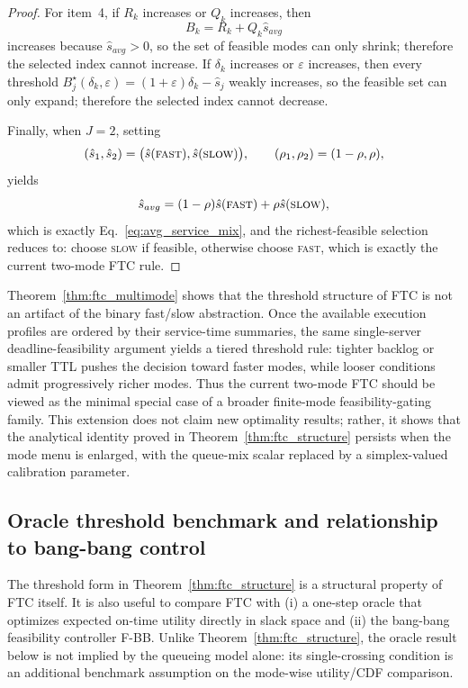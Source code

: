 \documentclass[preprint,12pt]{elsarticle}
\begin{document}
\begin{proof}
For item~4, if $R_k$ increases or $Q_k$ increases, then
\[
B_k = R_k + Q_k \hat{s}_{avg}
\]
increases because $\hat{s}_{avg} > 0$, so the set of feasible modes can
only shrink; therefore the selected index cannot increase. If $\delta_k$
increases or $\varepsilon$ increases, then every threshold
$B_j^\star(\delta_k,\varepsilon)=(1+\varepsilon)\delta_k-\hat{s}_j$ weakly
increases, so the feasible set can only expand; therefore the selected index
cannot decrease.

Finally, when $J=2$, setting
\[
(\hat{s}_1,\hat{s}_2)=\bigl(\hat{s}(\textsc{fast}),\hat{s}(\textsc{slow})\bigr), \qquad
(\rho_1,\rho_2)=(1-\rho,\rho),
\]
yields
\[
\hat{s}_{avg}
=
(1-\rho)\hat{s}(\textsc{fast})+\rho \hat{s}(\textsc{slow}),
\]
which is exactly Eq.~\eqref{eq:avg_service_mix}, and the richest-feasible selection reduces to:
choose \textsc{slow} if feasible, otherwise choose \textsc{fast}, which is exactly the current
two-mode FTC rule.
\end{proof}

Theorem~\ref{thm:ftc_multimode} shows that the threshold structure of FTC is not an artifact of the binary fast/slow abstraction. Once the available execution profiles are ordered by their service-time summaries, the same single-server deadline-feasibility argument yields a tiered threshold rule: tighter backlog or smaller TTL pushes the decision toward faster modes, while looser conditions admit progressively richer modes. Thus the current two-mode FTC should be viewed as the minimal special case of a broader finite-mode feasibility-gating family. This extension does not claim new optimality results; rather, it shows that the analytical identity proved in Theorem~\ref{thm:ftc_structure} persists when the mode menu is enlarged, with the queue-mix scalar replaced by a simplex-valued calibration parameter.

\subsection{Oracle threshold benchmark and relationship to bang-bang control}
\label{sec:oracle_fbb}

The threshold form in Theorem~\ref{thm:ftc_structure} is a structural property of FTC itself. It is also useful to compare FTC with (i) a one-step oracle that optimizes expected on-time utility directly in slack space and (ii) the bang-bang feasibility controller F-BB. Unlike Theorem~\ref{thm:ftc_structure}, the oracle result below is not implied by the queueing model alone: its single-crossing condition is an additional benchmark assumption on the mode-wise utility/CDF comparison.
\end{document}
